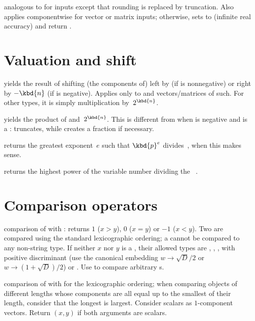  analogous to  for
 inputs except that rounding is replaced by truncation. Also applies
componentwise for vector or matrix inputs; otherwise, sets  to
 (infinite real accuracy) and return .

\section{Valuation and shift}

 yields the result of shifting
(the components of)  left by  (if  is nonnegative)
or right by $-\kbd{n}$ (if  is negative). Applies only to 
and vectors/matrices of such. For other types, it is simply multiplication
by~$2^{\kbd{n}}$.

 yields the product of 
and~$2^{\kbd{n}}$. This is different from  when  is negative
and  is a :  truncates, while 
creates a fraction if necessary.

 returns the greatest exponent~$e$ such that
$\kbd{p}^e$ divides~, when this makes sense.

 returns the highest power of the variable
number  dividing the ~.

\section{Comparison operators}


 comparison of  with : returns
$1$ ($x > y$), $0$ ($x = y$) or $-1$ ($x < y$). Two 
are compared using the standard lexicographic ordering; a 
cannot be compared to any non-string type. If neither
$x$ nor $y$ is a , their allowed types are , ,
,  with positive discriminant (use the canonical
embedding $w \to \sqrt{D}/2$ or $w \to (1 + \sqrt{D})/2$) or .
Use  to compare arbitrary s.

 comparison of  with  for the
lexicographic ordering; when comparing objects of different lengths whose
components are all equal up to the smallest of their length, consider that
the longest is largest. Consider scalars as $1$-component vectors. Return
$(x,y)$ if both arguments are scalars.

